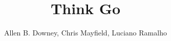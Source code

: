 \documentclass[10pt]{book}
\title{Think Go}
\author{Allen B. Downey, Chris Mayfield, Luciano Ramalho}
\newif\ifplastex
\begin{document}
\frontmatter

\ifplastex
    \usepackage{localdef}
    \maketitle

\newcount\anchorcnt
\newcommand*{\Anchor}[1]{%
  \@bsphack%
    \Hy@GlobalStepCount\anchorcnt%
    \edef\@currentHref{anchor.\the\anchorcnt}%
    \Hy@raisedlink{\hyper@anchorstart{\@currentHref}\hyper@anchorend}%
    \M@gettitle{}\label{#1}%
    \@esphack%
}


\else

\newtheorem{exercise}{Exercise}[chapter]



\end{document}
